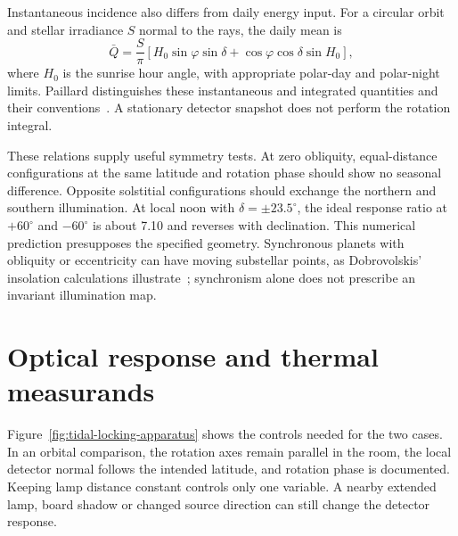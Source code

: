 Instantaneous incidence also differs from daily energy input. For a circular orbit and stellar irradiance $S$ normal to the rays, the daily mean is
\begin{equation}
 \bar Q=\frac{S}{\pi}\left[H_0\sin\varphi\sin\delta+
 \cos\varphi\cos\delta\sin H_0\right],
 \label{eq:tidal-locking-daily}
\end{equation}
where $H_0$ is the sunrise hour angle, with appropriate polar-day and polar-night limits. Paillard distinguishes these instantaneous and integrated quantities and their conventions~\cite{paillard2026}. A stationary detector snapshot does not perform the rotation integral.

These relations supply useful symmetry tests. At zero obliquity, equal-distance configurations at the same latitude and rotation phase should show no seasonal difference. Opposite solstitial configurations should exchange the northern and southern illumination. At local noon with $\delta=\pm23.5^\circ$, the ideal response ratio at $+60^\circ$ and $-60^\circ$ is about 7.10 and reverses with declination. This numerical prediction presupposes the specified geometry. Synchronous planets with obliquity or eccentricity can have moving substellar points, as Dobrovolskis' insolation calculations illustrate~\cite{dobrovolskis2011}; synchronism alone does not prescribe an invariant illumination map.

\section{Optical response and thermal measurands}
Figure~\ref{fig:tidal-locking-apparatus} shows the controls needed for the two cases. In an orbital comparison, the rotation axes remain parallel in the room, the local detector normal follows the intended latitude, and rotation phase is documented. Keeping lamp distance constant controls only one variable. A nearby extended lamp, board shadow or changed source direction can still change the detector response.

